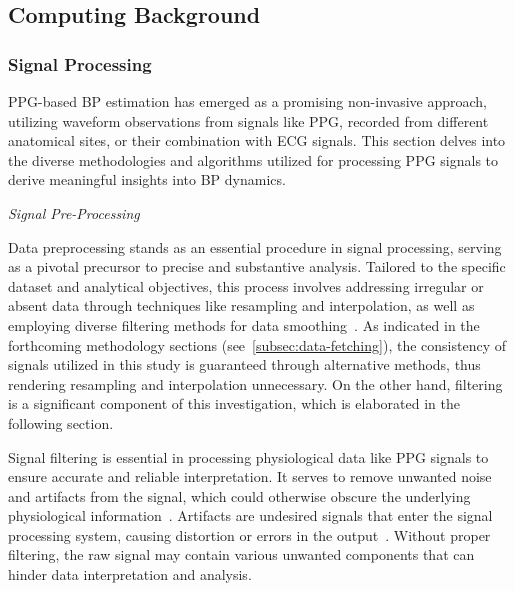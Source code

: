 \subsection{Computing Background}
\label{subsec:computing_background}

\subsubsection{Signal Processing}
\label{subsubsec:signal_processing}

PPG-based BP estimation has emerged as a promising non-invasive approach, utilizing waveform observations from signals like PPG, recorded from different anatomical sites, or their combination with ECG signals.
This section delves into the diverse methodologies and algorithms utilized for processing PPG signals to derive meaningful insights into BP dynamics.

\vspace{0.2cm}
\textit{Signal Pre-Processing}
\vspace{0.2cm}

Data preprocessing stands as an essential procedure in signal processing, serving as a pivotal precursor to precise and substantive analysis.
Tailored to the specific dataset and analytical objectives, this process involves addressing irregular or absent data through techniques like resampling and interpolation,
as well as employing diverse filtering methods for data smoothing~\cite{DataScientistGuide}.
As indicated in the forthcoming methodology sections (see~\ref{subsec:data-fetching}), the consistency of signals utilized in this study is guaranteed through alternative methods, thus rendering resampling and interpolation unnecessary.
On the other hand, filtering is a significant component of this investigation, which is elaborated in the following section.


Signal filtering is essential in processing physiological data like PPG signals to ensure accurate and reliable interpretation.
It serves to remove unwanted noise and artifacts from the signal, which could otherwise obscure the underlying physiological information~\cite{liangOptimalFilterShort2018}.
Artifacts are undesired signals that enter the signal processing system, causing distortion or errors in the output~\cite{SignalProcessingArtifacts}.
Without proper filtering, the raw signal may contain various unwanted components that can hinder data interpretation and analysis.

